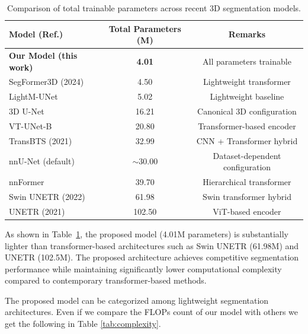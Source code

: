 \begin{table}[!htbp]
    \caption{Comparison of total trainable parameters across recent 3D segmentation models.}
    \label{tab:parameter_comparison}
    \centering
    \begin{tabular}{lcc}
        \toprule
        Model (Ref.) & Total Parameters (M) & Remarks \\
        \midrule
        \textbf{Our Model (this work)} & \textbf{4.01} & All parameters trainable \\
        SegFormer3D (2024) & 4.50 & Lightweight transformer \\
        LightM-UNet & 5.02 & Lightweight baseline \\
        3D U-Net & 16.21 & Canonical 3D configuration \\
        VT-UNet-B & 20.80 & Transformer-based encoder \\
        TransBTS (2021) & 32.99 & CNN + Transformer hybrid \\
        nnU-Net (default) & $\sim$30.00 & Dataset-dependent configuration \\
        nnFormer & 39.70 & Hierarchical transformer \\
        Swin UNETR (2022) & 61.98 & Swin transformer hybrid \\
        UNETR (2021) & 102.50 & ViT-based encoder \\
        \bottomrule
    \end{tabular}
\end{table}

As shown in Table~\ref{tab:parameter_comparison}, the proposed model (4.01M parameters) is substantially lighter than transformer-based architectures such as Swin UNETR (61.98M) and UNETR (102.5M). The proposed architecture achieves competitive segmentation performance while maintaining significantly lower computational complexity compared to contemporary transformer-based methods.

The proposed model can be categorized among lightweight segmentation architectures. Even if we compare the FLOPs count of our model with others we get the following in Table \ref{tab:complexity}.

